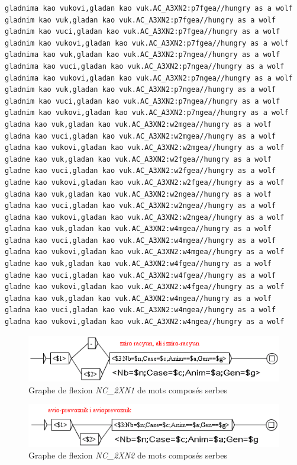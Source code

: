 \begin{verbatim}
gladnima kao vukovi,gladan kao vuk.AC_A3XN2:p7fgea//hungry as a wolf
gladnim kao vuk,gladan kao vuk.AC_A3XN2:p7fgea//hungry as a wolf
gladnim kao vuci,gladan kao vuk.AC_A3XN2:p7fgea//hungry as a wolf
gladnim kao vukovi,gladan kao vuk.AC_A3XN2:p7fgea//hungry as a wolf
gladnima kao vuk,gladan kao vuk.AC_A3XN2:p7ngea//hungry as a wolf
gladnima kao vuci,gladan kao vuk.AC_A3XN2:p7ngea//hungry as a wolf
gladnima kao vukovi,gladan kao vuk.AC_A3XN2:p7ngea//hungry as a wolf
gladnim kao vuk,gladan kao vuk.AC_A3XN2:p7ngea//hungry as a wolf
gladnim kao vuci,gladan kao vuk.AC_A3XN2:p7ngea//hungry as a wolf
gladnim kao vukovi,gladan kao vuk.AC_A3XN2:p7ngea//hungry as a wolf
gladna kao vuk,gladan kao vuk.AC_A3XN2:w2mgea//hungry as a wolf
gladna kao vuci,gladan kao vuk.AC_A3XN2:w2mgea//hungry as a wolf
gladna kao vukovi,gladan kao vuk.AC_A3XN2:w2mgea//hungry as a wolf
gladne kao vuk,gladan kao vuk.AC_A3XN2:w2fgea//hungry as a wolf
gladne kao vuci,gladan kao vuk.AC_A3XN2:w2fgea//hungry as a wolf
gladne kao vukovi,gladan kao vuk.AC_A3XN2:w2fgea//hungry as a wolf
gladna kao vuk,gladan kao vuk.AC_A3XN2:w2ngea//hungry as a wolf
gladna kao vuci,gladan kao vuk.AC_A3XN2:w2ngea//hungry as a wolf
gladna kao vukovi,gladan kao vuk.AC_A3XN2:w2ngea//hungry as a wolf
gladna kao vuk,gladan kao vuk.AC_A3XN2:w4mgea//hungry as a wolf
gladna kao vuci,gladan kao vuk.AC_A3XN2:w4mgea//hungry as a wolf
gladna kao vukovi,gladan kao vuk.AC_A3XN2:w4mgea//hungry as a wolf
gladne kao vuk,gladan kao vuk.AC_A3XN2:w4fgea//hungry as a wolf
gladne kao vuci,gladan kao vuk.AC_A3XN2:w4fgea//hungry as a wolf
gladne kao vukovi,gladan kao vuk.AC_A3XN2:w4fgea//hungry as a wolf
gladna kao vuk,gladan kao vuk.AC_A3XN2:w4ngea//hungry as a wolf
gladna kao vuci,gladan kao vuk.AC_A3XN2:w4ngea//hungry as a wolf
gladna kao vukovi,gladan kao vuk.AC_A3XN2:w4ngea//hungry as a wolf
\end{verbatim}
\normalsize

\begin{figure}[!htb]
  \centering
  \includegraphics[width=12.4cm]{resources/img/NC'2XN1'SRB.png}
  \caption{Graphe de flexion \emph{NC\_2XN1} de mots composés serbes}
  \label{fig:NC'2XN1'SRB}
\end{figure}

\begin{figure}[!htb]
  \centering
  \includegraphics[width=12.4cm]{resources/img/NC'2XN2'SRB.png}
  \caption{Graphe de flexion \emph{NC\_2XN2} de mots composés serbes}
  \label{fig:NC'2XN2'SRB}
\end{figure}

